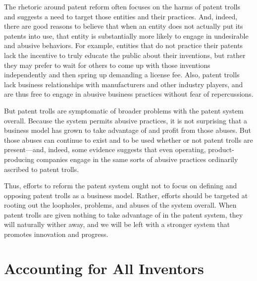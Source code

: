 \documentclass[11pt,twocolumn,titlepage]{article}
\begin{document}
The rhetoric around patent reform often focuses on the harms of patent trolls
and suggests a need to target those entities and their practices. And, indeed,
there are good reasons to believe that when an entity does not actually put its
patents into use, that entity is substantially more likely to engage in
undesirable and abusive behaviors. For example, entities that do not practice
their patents lack the incentive to truly educate the public about their
inventions, but rather they may prefer to wait
for others to come up with those inventions independently and then spring up
demanding a license fee. Also,
patent trolls lack business relationships with manufacturers and other industry
players, and are thus free to engage in abusive business practices
without fear of repercussions.

But patent trolls are symptomatic of broader problems with the patent system
overall. Because the system permits abusive practices, it is not surprising
that a business model has grown to take advantage of and profit from those
abuses. But those abuses can continue to exist and to be used whether or not
patent trolls are present---and, indeed, some evidence suggests that even
operating, product-producing companies engage in the same sorts of abusive
practices ordinarily ascribed to patent trolls.

Thus, efforts to reform the patent system ought not to focus on defining and
opposing patent trolls as a business model. Rather, efforts should be targeted
at rooting out the loopholes, problems, and abuses of the system overall. When
patent trolls are given nothing to take advantage of in the patent system, they
will naturally wither away, and we will be left with a stronger system that
promotes innovation and progress.

\section{Accounting for All Inventors}
\SectionNote
{}
 
\end{document}
